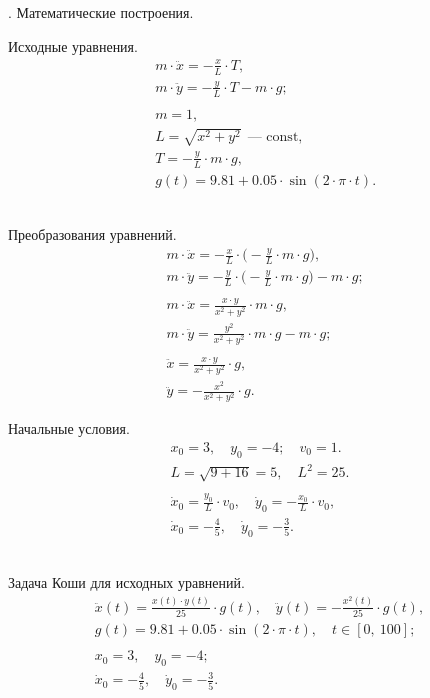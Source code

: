 \documentclass[a4paper,14pt]{extarticle}
\begin{document}
. Математические построения. \\ \par

\noindent Исходные уравнения.
\begin{align*}
	& m\cdot\ddot{x} =-\frac{x}{L}\cdot T, \\
	& m\cdot\ddot{y} =-\frac{y}{L}\cdot T - m\cdot g; \\
	\\
	& m = 1, \\
	& L = \sqrt{x^2 + y^2}\ \ \text{---\ \ const}, \\
	& T = -\frac{y}{L}\cdot m\cdot g, \\
	& g(t) = 9.81 + 0.05\cdot\sin(2\cdot\pi\cdot t).
\end{align*} \\ \par

\noindent Преобразования уравнений.
\begin{align*}
	& m\cdot\ddot{x} = -\frac{x}{L}\cdot\Big( -\frac{y}{L}\cdot m\cdot g\Big), \\
	& m\cdot\ddot{y} = -\frac{y}{L}\cdot\Big( -\frac{y}{L}\cdot m\cdot g\Big) - m\cdot g; \\
	\\
	& m\cdot\ddot{x} = \frac{x\cdot y}{x^2 + y^2}\cdot m\cdot g, \\
	& m\cdot\ddot{y} = \frac{y^2}{x^2 + y^2}\cdot m\cdot g - m\cdot g; \\
	\\
	& \ddot{x} = \frac{x\cdot y}{x^2 + y^2}\cdot g, \\
	& \ddot{y} = -\frac{x^2}{x^2 + y^2}\cdot g.
\end{align*} \newpage

\noindent Начальные условия.
\begin{gather*}
	x_0 = 3,\quad y_0 = -4;\quad v_0 = 1. \\
	L = \sqrt{9 + 16} = 5,\quad L^2 = 25. \\
	\\
	\dot{x}_0 = \frac{y_0}{L}\cdot v_0,\quad\dot{y}_0 = -\frac{x_0}{L}\cdot v_0, \\
	\dot{x}_0 = -\frac{4}{5},\quad\dot{y}_0 = -\frac{3}{5}.
\end{gather*} \\ \par

\noindent Задача Коши для исходных уравнений.
\begin{gather*}
	\ddot{x}(t)=\frac{x(t)\cdot y(t)}{25}\cdot g(t),\quad \ddot{y}(t)=-\frac{x^2(t)}{25}\cdot g(t), \\
	g(t) = 9.81 + 0.05\cdot\sin(2\cdot\pi\cdot t),\quad t\in[0,\ 100]; \\ 
	\\
	x_0 = 3,\quad y_0 = -4; \\
	\dot{x}_0 = -\frac{4}{5},\quad\dot{y}_0 = -\frac{3}{5}.
\end{gather*} \\ \par
\end{document}
